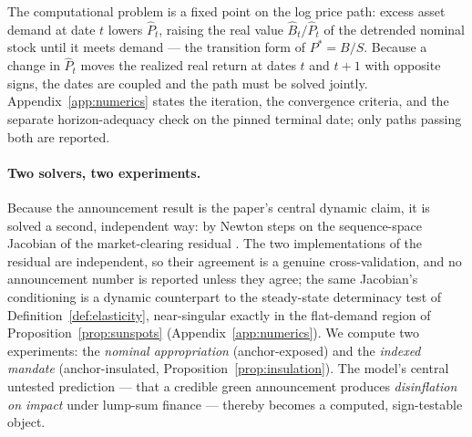 \documentclass[12pt]{article}
\newcommand{\Sfun}{S}
\begin{document}
The computational problem is a fixed point on the log
price path: excess asset demand at date $t$ lowers $\hat P_t$, raising the
real value $\hat B_t/\hat P_t$ of the detrended nominal stock until it
meets demand --- the transition form of $P^{*}=B/\Sfun$. Because a change
in $\hat P_t$ moves the realized real return at dates $t$ and $t+1$ with
opposite signs, the dates are coupled and the path must be solved jointly.
Appendix~\ref{app:numerics} states the iteration, the convergence criteria,
and the separate horizon-adequacy check on the pinned terminal date; only
paths passing both are reported.

\paragraph{Two solvers, two experiments.} Because the announcement result is
the paper's central dynamic claim, it is solved a second, independent way:
by Newton steps on the sequence-space Jacobian of the market-clearing
residual \citep{auclert2021}. The two implementations of the residual are
independent, so their agreement is a genuine cross-validation, and no
announcement number is reported unless they agree; the same Jacobian's
conditioning is a dynamic counterpart to the steady-state determinacy test
of Definition~\ref{def:elasticity}, near-singular exactly in the flat-demand
region of Proposition~\ref{prop:sunspots} (Appendix~\ref{app:numerics}). We
compute two experiments: the \emph{nominal appropriation} (anchor-exposed)
and the \emph{indexed mandate} (anchor-insulated,
Proposition~\ref{prop:insulation}). The model's central untested prediction
--- that a credible green announcement produces \emph{disinflation on
impact} under lump-sum finance --- thereby becomes a computed,
sign-testable object.
\end{document}
